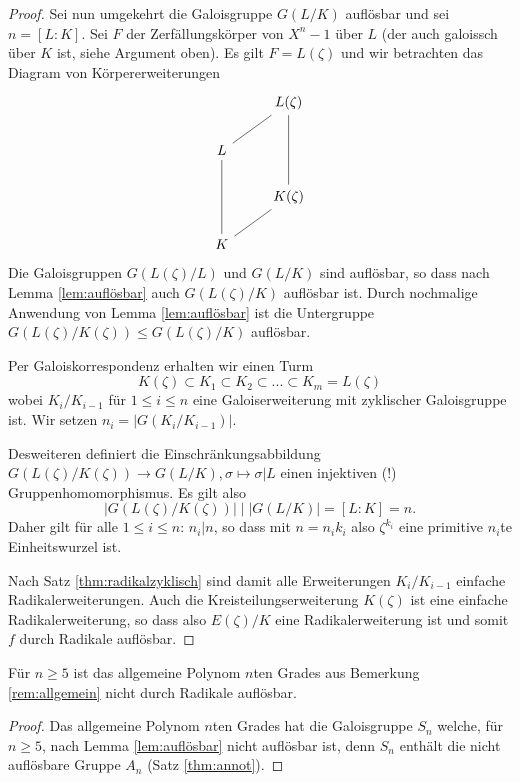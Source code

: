 \documentclass{book}
\begin{document}
\begin{proof}
    Sei nun umgekehrt die Galoisgruppe $G(L/K)$ auflösbar und sei $n = [L:K]$.
    Sei $F$ der Zerfällungskörper von $X^n -1 $ über $L$ (der auch
    galoissch über $K$ ist, siehe Argument oben). Es gilt $F = L(\zeta)$ und
    wir betrachten das Diagram von Körpererweiterungen
    \[
    \begin{tikzcd}
            & L(\zeta)\\
         L\ar[dash]{ur}    & \\
         &  K(\zeta) \ar[dash]{uu}\\
        K \ar[dash]{ur}\ar[dash]{uu} & 
    \end{tikzcd}
    \]
    Die Galoisgruppen $G(L(\zeta)/L)$ und $G(L/K)$ sind auflösbar, so dass nach
    Lemma \ref{lem:auflösbar} auch $G(L(\zeta)/K)$ auflösbar ist. Durch
    nochmalige Anwendung von Lemma \ref{lem:auflösbar} ist die Untergruppe
    $G(L(\zeta)/K(\zeta)) \le G(L(\zeta)/K)$ auflösbar. 

    Per Galoiskorrespondenz erhalten wir einen Turm
    \[
        K(\zeta) \subset K_1 \subset K_2 \subset ... \subset K_m = L(\zeta)
    \]
    wobei $K_i/K_{i-1}$ für $1 \le i \le n$ eine Galoiserweiterung mit
    zyklischer Galoisgruppe ist. Wir setzen $n_i = |G(K_i/K_{i-1})|$. 

    Desweiteren definiert die Einschränkungsabbildung $G(L(\zeta)/K(\zeta)) \to
    G(L/K), \sigma \mapsto \sigma|L$ einen injektiven (!) Gruppenhomomorphismus. Es gilt also 
    \[
        |G(L(\zeta)/K(\zeta))| \mid |G(L/K)| = [L:K] = n.
    \]
    Daher gilt für alle $1 \le i \le n$: $n_i | n$, so dass mit $n = n_i k_i$
    also $\zeta^{k_i}$ eine primitive $n_i$te Einheitswurzel ist. 

    Nach Satz \ref{thm:radikalzyklisch} sind damit alle Erweiterungen
    $K_i/K_{i-1}$ einfache Radikalerweiterungen. Auch die
    Kreisteilungserweiterung $K(\zeta)$ ist eine einfache Radikalerweiterung,
    so dass also $E(\zeta)/K$ eine Radikalerweiterung ist und somit $f$ durch Radikale auflösbar. 
\end{proof}

\begin{cor}
    \label{cor:allg}
    Für $n \ge 5$ ist das allgemeine Polynom $n$ten Grades aus Bemerkung
    \ref{rem:allgemein} nicht durch Radikale auflösbar. 
\end{cor}
\begin{proof}
    Das allgemeine Polynom $n$ten Grades hat die Galoisgruppe $S_n$ welche, für
    $n \ge 5$, nach Lemma \ref{lem:auflösbar} nicht auflösbar ist, denn $S_n$
    enthält die nicht auflösbare Gruppe $A_n$ (Satz \ref{thm:annot}).
\end{proof}

\printindex
\end{document}
